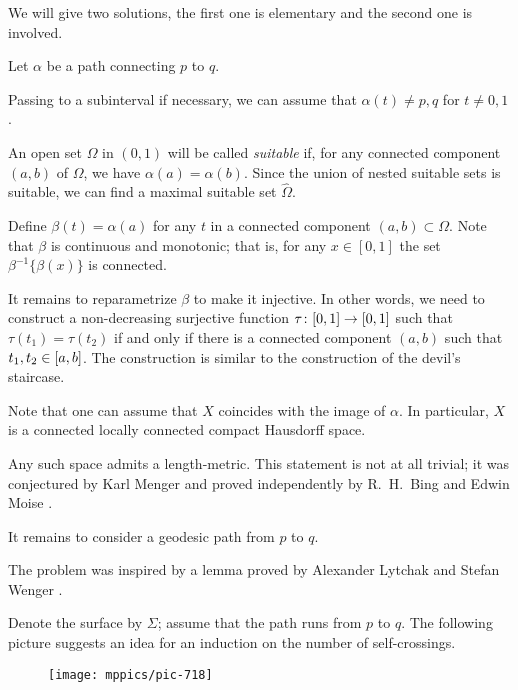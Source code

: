 We will give two solutions, the first one is elementary and the second one is involved. 

Let $\alpha$ be a path connecting $p$ to $q$.

Passing to a subinterval if necessary,
we can assume that $\alpha(t)\ne p,q$ for $t\ne0,1$.

An open set $\Omega$ in $(0,1)$ will be called {}\emph{suitable} if, for any connected component $(a,b)$ of $\Omega$, we have $\alpha(a)=\alpha(b)$.
Since the union of nested suitable sets is suitable, we can find a maximal suitable set $\hat \Omega$.

Define $\beta(t)=\alpha(a)$ for any $t$ in a connected component $(a,b)\subset\Omega$.
Note that $\beta$ is continuous and monotonic;
that is, for any $x\in [0,1]$ the set $\beta^{-1}\{\beta(x)\}$ is connected.

It remains to reparametrize $\beta$ to make it injective.
In other words, we need to construct a non-decreasing surjective function $\tau\:[0,1]\z\to[0,1]$ such that 
$\tau(t_1)=\tau(t_2)$ if and only if there is a connected component $(a,b)$ such that $t_1,t_2\z\in [a,b]$.
The construction is similar to the construction of the devil's staircase.
\qeds

Note that one can assume that $X$ coincides with the image of $\alpha$.
In particular, $X$ is a connected locally connected compact Hausdorff space.

Any such space admits a length-metric.
This statement is not at all trivial;
it was conjectured by Karl Menger \cite{menger}
and proved independently 
by R.~H.~Bing  \cite{bing-length-0, bing-length-1} 
and Edwin Moise \cite{moise}.

It remains to consider a geodesic path from $p$ to $q$.
\qeds

The problem was inspired by a lemma 
proved by 
Alexander Lytchak
and Stefan Wenger \cite[see 7.13 in][]{lytchak-wenger}.


Denote the surface by $\Sigma$; assume that the path runs from $p$ to $q$.
The following picture suggests an idea for an induction on the number of self-crossings.

\begin{figure}[!ht]
\vskip0mm
\centering
\texttt{[image: mppics/pic-718]}
\end{figure}

